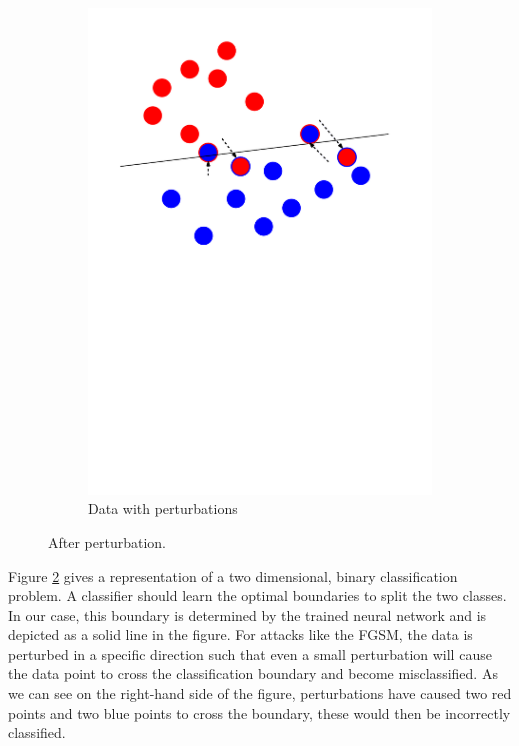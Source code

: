 \begin{figure}[h!]
\begin{subfigure}{.4\textwidth}
		\includegraphics[width=\textwidth]{fgsm}
		\caption{Data with perturbations}
		\label{fig:fgsm}
	\end{subfigure}
	\caption{After perturbation.}
	\label{fig:fgsm_attack}
\end{figure}

Figure \ref{fig:fgsm_attack} gives a representation of a two dimensional, binary classification problem. A classifier should learn the optimal boundaries to split the two classes. In our case, this boundary is determined by the trained neural network and is depicted as a solid line in the figure. For attacks like the FGSM, the data is perturbed in a specific direction such that even a small perturbation will cause the data point to cross the classification boundary and become misclassified. As we can see on the right-hand side of the figure, perturbations have caused two red points and two blue points to cross the boundary, these would then be incorrectly classified.
